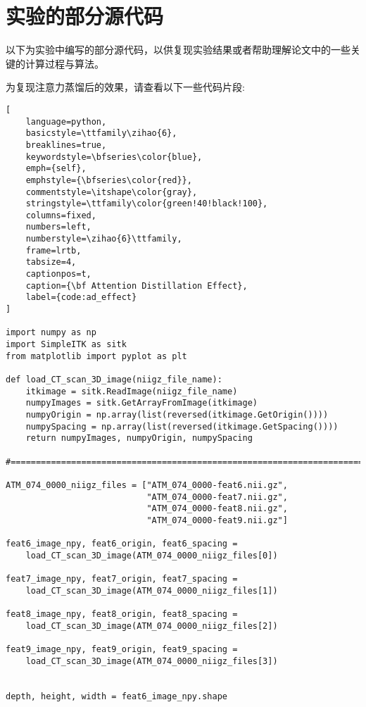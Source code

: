 
\chapter{实验的部分源代码}\label{chap:reproduce_experiment}

以下为实验中编写的部分源代码，以供复现实验结果或者帮助理解论文中的一些关键的计算过程与算法。

为复现注意力蒸馏后的效果，请查看以下一些代码片段:
\begin{lstlisting}[
    language=python,
    basicstyle=\ttfamily\zihao{6},
    breaklines=true,
    keywordstyle=\bfseries\color{blue},
    emph={self},
    emphstyle={\bfseries\color{red}},
    commentstyle=\itshape\color{gray},
    stringstyle=\ttfamily\color{green!40!black!100},
    columns=fixed,
    numbers=left,
    numberstyle=\zihao{6}\ttfamily,
    frame=lrtb,
    tabsize=4,
    captionpos=t,
    caption={\bf Attention Distillation Effect},
    label={code:ad_effect}
]

import numpy as np
import SimpleITK as sitk
from matplotlib import pyplot as plt

def load_CT_scan_3D_image(niigz_file_name):
    itkimage = sitk.ReadImage(niigz_file_name)
    numpyImages = sitk.GetArrayFromImage(itkimage)
    numpyOrigin = np.array(list(reversed(itkimage.GetOrigin())))
    numpySpacing = np.array(list(reversed(itkimage.GetSpacing())))
    return numpyImages, numpyOrigin, numpySpacing

#================================================================================

ATM_074_0000_niigz_files = ["ATM_074_0000-feat6.nii.gz", 
                            "ATM_074_0000-feat7.nii.gz", 
                            "ATM_074_0000-feat8.nii.gz", 
                            "ATM_074_0000-feat9.nii.gz"]

feat6_image_npy, feat6_origin, feat6_spacing = 
	load_CT_scan_3D_image(ATM_074_0000_niigz_files[0])

feat7_image_npy, feat7_origin, feat7_spacing = 
	load_CT_scan_3D_image(ATM_074_0000_niigz_files[1])

feat8_image_npy, feat8_origin, feat8_spacing = 
	load_CT_scan_3D_image(ATM_074_0000_niigz_files[2])

feat9_image_npy, feat9_origin, feat9_spacing = 
	load_CT_scan_3D_image(ATM_074_0000_niigz_files[3])
	

depth, height, width = feat6_image_npy.shape


\end{lstlisting}
